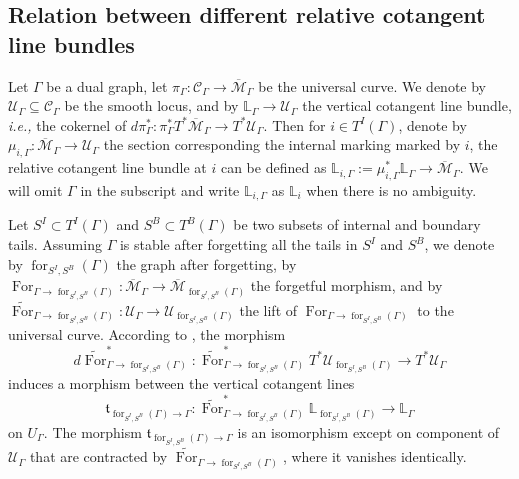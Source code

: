 \documentclass[11pt]{amsart}
\theoremstyle{definition}
\theoremstyle{remark}
\renewcommand{\for}{\operatorname{for}}
\newcommand{\For}{\operatorname{For}}
\newcommand{\<}{\left<}
\renewcommand{\>}{\right>}
\numberwithin{equation}{section}
\def\Mbar{{\overline{\mathcal M}}}
\begin{document}
\subsection{Relation between different relative cotangent line bundles}\label{sec cotangent lines relation}
Let $\Gamma$ be a dual graph, let $\pi_{\Gamma}\colon\mathcal C_{\Gamma}\to \Mbar_{\Gamma}$ be the universal curve. We denote by $\mathcal U_{\Gamma}\subseteq \mathcal C_{\Gamma}$ be the smooth locus, and by $\mathbb L_{\Gamma}\to \mathcal U_{\Gamma}$ the vertical cotangent line bundle, \textit{i.e.,} the cokernel of $d\pi^*_{\Gamma}\colon \pi^*_{\Gamma} T^*\Mbar_{\Gamma}\to T^* \mathcal U_{\Gamma}$. Then for $i\in T^I(\Gamma)$, denote by $\mu_{i,\Gamma}\colon \Mbar_{\Gamma}\to \mathcal U_{\Gamma}$ the section corresponding the internal marking marked by $i$, the relative cotangent line bundle at $i$ can be defined as $\mathbb L_{i,\Gamma}:=\mu_{i,\Gamma}^*\mathbb L_{\Gamma} \to \Mbar_{\Gamma}$. We will omit $\Gamma$ in the subscript and write $\mathbb L_{i,\Gamma}$ as $\mathbb L_{i}$ when there is no ambiguity.


Let $S^I\subset T^I(\Gamma)$ and $S^B\subset T^B(\Gamma)$ be two subsets of internal and boundary tails. Assuming $\Gamma$ is stable after forgetting all the tails in $S^I$ and $S^B$, we denote by $\for_{{S^I,S^B}}(\Gamma)$ the graph after forgetting, by $\For_{\Gamma \to \for_{{S^I,S^B}}(\Gamma)}\colon \Mbar_\Gamma\to \Mbar_{\for_{{S^I,S^B}}(\Gamma)}$ the forgetful morphism, and by $\widetilde{\For}_{\Gamma \to \for_{{S^I,S^B}}(\Gamma)}\colon \mathcal U_{\Gamma} \to \mathcal U_{\for_{{S^I,S^B}}(\Gamma)}$ the lift of $\For_{\Gamma \to \for_{{S^I,S^B}}(\Gamma)}$ to the universal curve. According to \cite[\S3.5]{PST14}, the morphism 
$$d\widetilde{\For}^*_{\Gamma \to \for_{{S^I,S^B}}(\Gamma)}\colon \widetilde{\For}_{\Gamma \to \for_{{S^I,S^B}}(\Gamma)}^*T^*\mathcal U_{\for_{{S^I,S^B}}(\Gamma)}\to T^*\mathcal U_{\Gamma}$$ induces a morphism between the vertical cotangent lines $$\mathfrak t_{\for_{{S^I,S^B}}(\Gamma)\to \Gamma}\colon \widetilde{\For}_{\Gamma\to \for_{{S^I,S^B}}(\Gamma)}^*\mathbb L_{\for_{{S^I,S^B}}(\Gamma)}\to \mathbb L_{\Gamma}$$
on $U_{\Gamma}$.
The morphism $\mathfrak t_{\for_{{S^I,S^B}}(\Gamma)\to\Gamma}$ is an isomorphism except on component of $\mathcal U_{\Gamma}$ that are contracted by $\widetilde{\For}_{\Gamma \to \for_{{S^I,S^B}}(\Gamma)}$, where it vanishes identically. 
\end{document}
